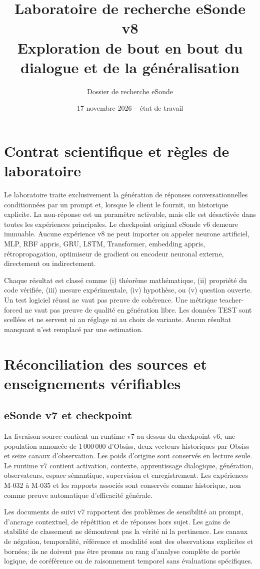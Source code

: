 \documentclass[11pt,a4paper]{report}
\title{Laboratoire de recherche eSonde v8\\Exploration de bout en bout du dialogue et de la généralisation}
\author{Dossier de recherche eSonde}
\date{17 novembre 2026 -- état de travail}
\begin{document}
\maketitle
\tableofcontents

\chapter*{Contrat scientifique et règles de laboratoire}
Le laboratoire traite exclusivement la génération de réponses conversationnelles conditionnées par un prompt et, lorsque le client le fournit, un historique explicite. La non-réponse est un paramètre activable, mais elle est désactivée dans toutes les expériences principales. Le checkpoint original eSonde v6 demeure immuable. Aucune expérience v8 ne peut importer ou appeler neurone artificiel, MLP, RBF appris, GRU, LSTM, Transformer, embedding appris, rétropropagation, optimiseur de gradient ou encodeur neuronal externe, directement ou indirectement.

Chaque résultat est classé comme (i) théorème mathématique, (ii) propriété du code vérifiée, (iii) mesure expérimentale, (iv) hypothèse, ou (v) question ouverte. Un test logiciel réussi ne vaut pas preuve de cohérence. Une métrique teacher-forced ne vaut pas preuve de qualité en génération libre. Les données TEST sont scellées et ne servent ni au réglage ni au choix de variante. Aucun résultat manquant n'est remplacé par une estimation.

\chapter{Réconciliation des sources et enseignements vérifiables}
\section{eSonde v7 et checkpoint}
La livraison source contient un runtime v7 au-dessus du checkpoint v6, une population annoncée de 1\,000\,000 d'Obsiss, deux vecteurs historiques par Obsiss et seize canaux d'observation. Les poids d'origine sont conservés en lecture seule. Le runtime v7 contient activation, contexte, apprentissage dialogique, génération, observateurs, espace sémantique, supervision et enregistrement. Les expériences M-032 à M-035 et les rapports associés sont conservés comme historique, non comme preuve automatique d'efficacité générale.

Les documents de suivi v7 rapportent des problèmes de sensibilité au prompt, d'ancrage contextuel, de répétition et de réponses hors sujet. Les gains de stabilité de classement ne démontrent pas la vérité ni la pertinence. Les canaux de négation, temporalité, référence et modalité sont des observations explicites et bornées; ils ne doivent pas être promus au rang d'analyse complète de portée logique, de coréférence ou de raisonnement temporel sans évaluations spécifiques.
\end{document}
